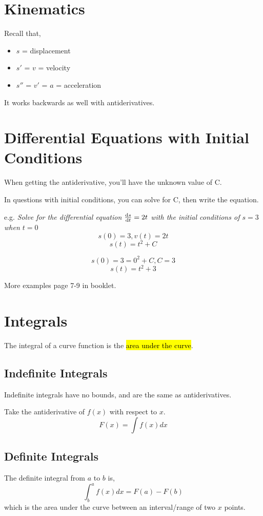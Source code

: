 \documentclass[a4paper,12pt]{article}
\begin{document}
\pagebreak

\section{Kinematics}
Recall that,
\begin{itemize}
    \item{$s$ = displacement}
    \item{$s'$ = $v$ = velocity}
    \item{$s''$ = $v'$ = $a$ = acceleration}
\end{itemize}
It works backwards as well with antiderivatives.

\section{Differential Equations with Initial Conditions}
When getting the antiderivative, you'll have the unknown value of C.

In questions with initial conditions, you can solve for C, then write the equation.

e.g. \emph{Solve for the differential equation $\dv{s}{t} = 2t$ with the initial conditions of $s = 3$ when $t = 0$}
$$s(0) = 3, v(t) = 2t$$
$$s(t) = t^2 + C$$

$$s(0) = 3 = 0^2 + C, C = 3$$
$$s(t) = t^2 + 3$$

More examples page 7-9 in booklet.

\pagebreak

\section{Integrals}
The integral of a curve function is the \hl{area under the curve}.

\subsection{Indefinite Integrals}
Indefinite integrals have no bounds, and are the same as antiderivatives.

Take the antiderivative of $f(x)$ with respect to $x$.
$$F(x) = \int{f(x)}dx$$

\subsection{Definite Integrals}
The definite integral from $a$ to $b$ is,
$$\int^a_b{f(x)}dx = F(a) - F(b)$$
which is the area under the curve between an interval/range of two $x$ points.
\end{document}
